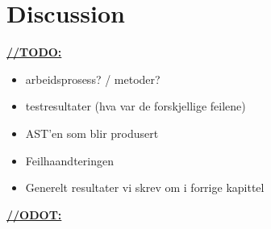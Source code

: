 \chapter{Discussion}

\underline{\textbf{\LARGE //TODO:}}

\begin{itemize}
\item arbeidsprosess? / metoder? 
\item testresultater (hva var de forskjellige feilene)
\item AST'en som blir produsert
\item Feilhaandteringen
\item Generelt resultater vi skrev om i forrige kapittel
\end{itemize}


\underline{\textbf{\LARGE //ODOT:}}

